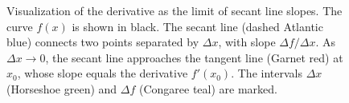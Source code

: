 \begin{figure}[htbp]
\caption{Visualization of the derivative as the limit of secant line slopes. The curve $f(x)$ is shown in black. The secant line (dashed Atlantic blue) connects two points separated by $\Delta x$, with slope $\Delta f/\Delta x$. As $\Delta x \to 0$, the secant line approaches the tangent line (Garnet red) at $x_0$, whose slope equals the derivative $f'(x_0)$. The intervals $\Delta x$ (Horseshoe green) and $\Delta f$ (Congaree teal) are marked.}
\label{fig:derivative_visualization}
\end{figure}
